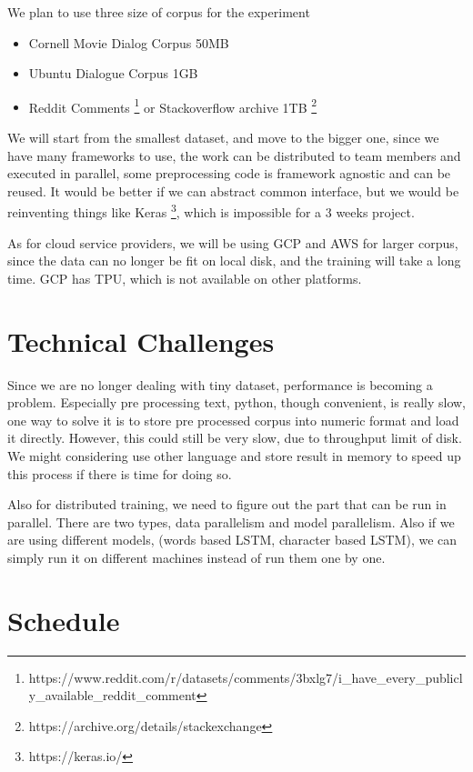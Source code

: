 \documentclass[11pt,letterpaper,twocolumn,oneside]{article}
\begin{document}
We plan to use three size of corpus for the experiment

\begin{itemize}
  \item Cornell Movie Dialog Corpus 50MB \cite{Danescu-Niculescu-Mizil+Lee:11a}
  \item Ubuntu Dialogue Corpus 1GB \cite{lowe2015ubuntu}
  \item Reddit Comments \footnote{https://www.reddit.com/r/datasets/comments/3bxlg7/i\_have\_every\_publicly\_available\_reddit\_comment}
  or Stackoverflow archive 1TB \footnote{https://archive.org/details/stackexchange}
\end{itemize}

We will start from the smallest dataset, and move to the bigger one, since
we have many frameworks to use, the work can be distributed to team members and
executed in parallel, some preprocessing code is framework agnostic and can be reused.
It would be better if we can abstract common interface, but we would be reinventing
things like Keras \footnote{https://keras.io/}, which is impossible for a 3 weeks project.

As for cloud service providers, we will be using GCP and AWS for larger corpus,
since the data can no longer be fit on local disk, and the training will take a long time.
GCP has TPU, which is not available on other platforms.

\section{Technical Challenges}

Since we are no longer dealing with tiny dataset, performance is becoming a problem.
Especially pre processing text, python, though convenient, is really slow, one way
to solve it is to store pre processed corpus into numeric format and load it directly.
However, this could still be very slow, due to throughput limit of disk.
We might considering use other language and store result in memory to speed up this process if there is time for doing so.

Also for distributed training, we need to figure out the part that can be run in parallel.
There are two types, data parallelism and model parallelism.
Also if we are using different models, (words based LSTM, character based LSTM),
we can simply run it on different machines instead of run them one by one.

\section{Schedule}
\end{document}
